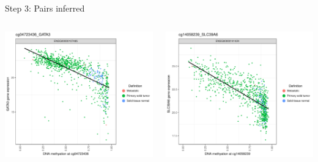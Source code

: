 \documentclass[slidestop,compress,11pt,xcolor=dvipsnames]{beamer}
\begin{document}
\begin{frame}{Step 3: Pairs inferred}
 \vspace*{0.8cm}
 \begin{columns}[T]
  \begin{column}{0.5\textwidth}
   \includegraphics[width=1.0\linewidth]{cg04723436_GATA3_bypair.pdf}
  \end{column}
  \begin{column}{0.5\textwidth}
   \vspace{0.2cm}
   \includegraphics[width=1.0\linewidth]{cg14058239_SLC39A6_bypair.pdf}
  \end{column}
 \end{columns}
\end{frame}
\end{document}
